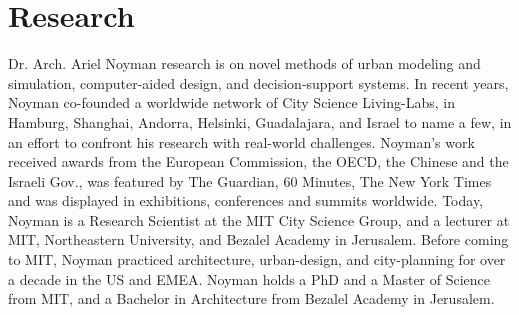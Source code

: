 \section*{Research}

 {
  Dr. Arch. Ariel Noyman research is on novel methods of urban modeling and simulation, computer-aided design, and decision-support systems. In recent years, Noyman co-founded a worldwide network of City Science Living-Labs, in Hamburg, Shanghai, Andorra, Helsinki, Guadalajara, and Israel to name a few, in an effort to confront his research with real-world challenges. Noyman's work received awards from the European Commission, the OECD, the Chinese and the Israeli Gov., was featured by The Guardian, 60 Minutes, The New York Times and was displayed in exhibitions, conferences and summits worldwide. Today, Noyman is a Research Scientist at the MIT City Science Group, and a lecturer at MIT, Northeastern University, and Bezalel Academy in Jerusalem. Before coming to MIT, Noyman practiced architecture, urban-design, and city-planning for over a decade in the US and EMEA. Noyman holds a PhD and a Master of Science from MIT, and a Bachelor in Architecture from Bezalel Academy in Jerusalem.
 }

